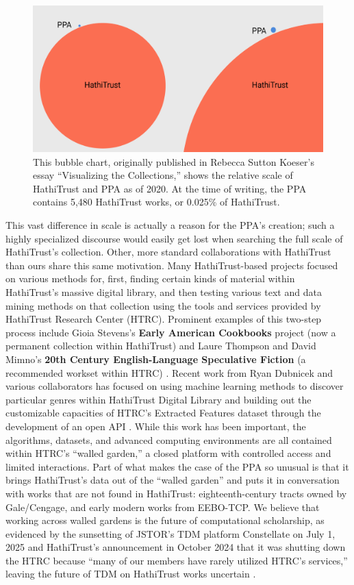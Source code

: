 \documentclass{anthology-ch}         %
\begin{document}
\begin{figure}
    \centering
    \includegraphics[width=0.75\linewidth]{figures/bubble-chart.png}
    \caption{This bubble chart, originally published in Rebecca Sutton Koeser’s essay “Visualizing the Collections,”\cite{koeser_visualizing_2020} shows the relative scale of HathiTrust and PPA as of 2020. At the time of writing, the PPA contains 5,480 HathiTrust works, or 0.025\% of HathiTrust. }
    \label{fig:bubble-chart}
\end{figure}
This vast difference in scale is actually a reason for the PPA’s creation; such a highly specialized discourse would easily get lost when searching the full scale of HathiTrust’s collection. Other, more standard collaborations with HathiTrust than ours share this same motivation. Many HathiTrust-based projects focused on various methods for, first, finding certain kinds of material within HathiTrust’s massive digital library, and then testing various text and data mining methods on that collection using the tools and services provided by HathiTrust Research Center (HTRC)\cite{noauthor_hathitrust_nodate}. Prominent examples of this two-step process include Gioia Stevens’s \textbf{Early American Cookbooks} project (now a permanent collection within HathiTrust) \cite{stevens_new_2017} and Laure Thompson and David Mimno’s \textbf{20th Century English-Language Speculative Fiction }(a recommended workset within HTRC) \cite{thompson_laure_building_nodate} \cite{noauthor_recommended_nodate}. Recent work from Ryan Dubnicek and various collaborators has focused on using machine learning methods to discover particular genres within HathiTrust Digital Library \cite{parulian_uncovering_2022} \cite{dubnicek_ryan_piloting_2023} and building out the customizable capacities of HTRC’s Extracted Features dataset through the development of an open API \cite{john_a_walsh_library_nodate}. While this work has been important, the algorithms, datasets, and advanced computing environments are all contained within HTRC’s “walled garden,” a closed platform with controlled access and limited interactions. Part of what makes the case of the PPA so unusual is that it brings HathiTrust’s data out of the “walled garden” and puts it in conversation with works that are not found in HathiTrust: eighteenth-century tracts owned by Gale/Cengage, and early modern works from EEBO-TCP. We believe that working across walled gardens is the future of computational scholarship, as evidenced by the sunsetting of JSTOR’s TDM platform Constellate on July 1, 2025 \cite{noauthor_constellate_2019} and HathiTrust’s announcement in October 2024 that it was shutting down the HTRC because “many of our members have rarely utilized HTRC’s services,” leaving the future of TDM on HathiTrust works uncertain \cite{noauthor_plans_nodate}.
\end{document}

